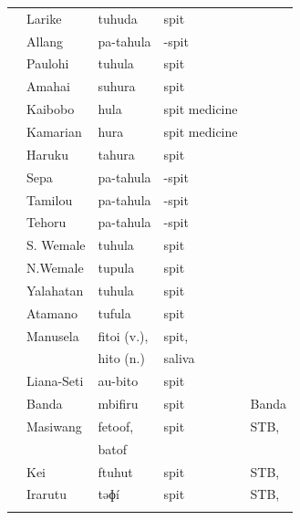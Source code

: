 {\begin{xltabular}[l]{\linewidth}{>{\hspace{-\tabcolsep}}l<{\hspace{-\tabcolsep}}>{\hspace{-\tabcolsep}\enspace}lll>{\raggedright\arraybackslash}X}
	&	Larike	&	{\hr\hr}tuhuda	&	spit	&		\\
	&	Allang	&	{\hr\hr}pa-tahula	&	-spit	&		\\
	&	Paulohi	&	{\hr\hr}tuhula	&	spit	&		\\
	&	Amahai	&	{\hr\hr}suhura	&	spit	&		\\
	&	Kaibobo	&	{\hr\hr}hula	&	spit medicine	&		\\
	&	Kamarian	&	{\hr\hr}hura	&	spit medicine	&		\\
	&	Haruku	&	{\hr\hr}tahura	&	spit	&		\\
	&	Sepa	&	{\hr\hr}pa-tahula	&	-spit	&		\\
	&	Tamilou	&	{\hr\hr}pa-tahula	&	-spit	&		\\
	&	Tehoru	&	{\hr\hr}pa-tahula	&	-spit	&		\\
	&	S. Wemale	&	{\hr\hr}tuhula	&	spit	&		\\
	&	N.Wemale	&	{\hr\hr}tupula	&	spit	&		\\
	&	Yalahatan	&	{\hr\hr}tuhula	&	spit	&		\\
	&	Atamano	&	{\hr\hr}tufula	&	spit	&		\\
	&	Manusela	&	{\hr\hr}fitoi (v.),	&	spit,	&		\\ \hhline{~}
	&						&	{\hr\hr}hito (n.)	&	saliva	&	\hp{ }	\\
	&	Liana-Seti	&	{\hr\hr}au-bito	&	spit	&		\\ \midrule\hhline{~}
	&	Banda	&	{\hr\hr}mbifiru	&	spit	&	Banda	\\ \midrule\hhline{~}
	&	Masiwang	&	{\hr\hr}fetoof,&	spit	&	STB, 	\\	\hhline{~}
	&			&	{\hr\hr}batof	&	\hp{ }	&	\\
	&	Kei	&	{\hr\hr}ftuhut	&	spit	&	STB, 	\\
	&	Irarutu	&	{\hr\hr}təɸí	&	spit	&	STB, 	\\
\lspbottomrule
\end{xltabular}\addtocounter{table}{-1}}